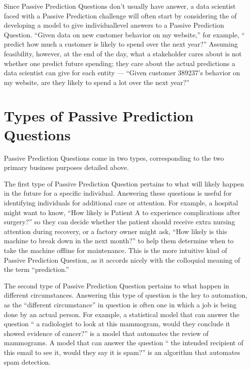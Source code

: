 \documentclass[letterpaper,10pt,english]{jupyterBook}
\begin{document}
\sphinxAtStartPar
Since Passive Prediction Questions don’t usually have  answer, a data scientist faced with a Passive Prediction challenge will often start by considering the  of developing a model to give individual\sphinxhyphen{}level answers to a Passive Prediction Question. “Given data on new customer behavior on my website,” for example, “ predict how much a customer is likely to spend over the next year?” Assuming feasibility, however, at the end of the day, what a stakeholder cares about is not whether one  predict future spending; they care about the actual predictions a data scientist can give for each entity — “Given customer 389237’s behavior on my website, are they likely to spend a lot over the next year?”


\section{Types of Passive Prediction Questions}
\label{\detokenize{30_questions/20_using_passive_prediction_questions:types-of-passive-prediction-questions}}
\sphinxAtStartPar
Passive Prediction Questions come in two types, corresponding to the two primary business purposes detailed above.

\sphinxAtStartPar
The first type of Passive Prediction Question pertains to what will likely happen in the future for a specific individual. Answering these questions is useful for identifying individuals for additional care or attention. For example, a hospital might want to know, “How likely is Patient A to experience complications after surgery?” so they can decide whether the patient should receive extra nursing attention during recovery, or a factory owner might ask, “How likely is this machine to break down in the next month?” to help them determine when to take the machine offline for maintenance. This is the more intuitive kind of Passive Prediction Question, as it accords nicely with the colloquial meaning of the term “prediction.”

\sphinxAtStartPar
The second type of Passive Prediction Question pertains to what  happen in different circumstances. Answering this type of question is the key to automation, as the “different circumstance” in question is often one in which a job is being done by an actual person. For example, a statistical model that can answer the question “ a radiologist  to look at this mammogram, would they conclude it showed evidence of cancer?” is a model that automates the review of mammograms. A model that can answer the question “ the intended recipient of this email  to see it, would they say it is spam?” is an algorithm that automates spam detection.
\end{document}
